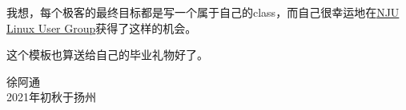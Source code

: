 \begin{preface}

我想，每个极客的最终目标都是写一个属于自己的class，而自己很幸运地在\href{https://git.nju.edu.cn/nju-lug/lug-introduction}{NJU Linux User Group}获得了这样的机会。

这个模板也算送给自己的毕业礼物好了。

\vspace{1cm}
\begin{flushright}
徐阿通\\
2021年初秋于扬州
\end{flushright}

\end{preface}
